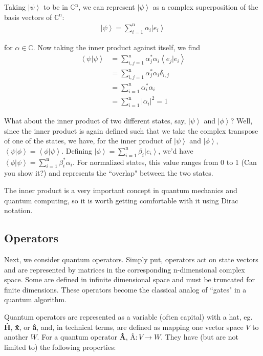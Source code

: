 \documentclass[11pt]{article} %
\newcommand{\ket}[1]{\left|#1\right\rangle}
\newcommand{\braket}[2]{\left\langle#1 |  #2\right\rangle}
\begin{document}
Taking $\ket{\psi}$ to be in $\mathbb{C}^\textrm{n}$, we can represent $\ket{\psi}$ as a complex superposition of the basis vectors of $\mathbb{C}^\textrm{n}$:
\begin{align}
    \ket{\psi} = \sum^\textrm{n}_{i=1}\alpha_i\ket{e_i} \nonumber
\end{align}

\noindent for $\alpha \in \mathbb{C}$. Now taking the inner product against itself, we find
\begin{align}
    \braket{\psi}{\psi} &= \sum^\textrm{n}_{i,j=1}\alpha_j^\ast\alpha_i\braket{e_j}{e_i}\nonumber\\
    &= \sum^\textrm{n}_{i,j=1}\alpha_j^\ast\alpha_i\delta_{i,j}\nonumber\\
    &= \sum^\textrm{n}_{i=1}\alpha_i^\ast\alpha_i\nonumber\\
    &= \sum^\textrm{n}_{i=1}\left|\alpha_i\right|^2 = 1\nonumber
\end{align}

What about the inner product of two different states, say, $\ket{\psi}$ and $\ket{\phi}$? Well, since the inner product is again defined such that we take the complex transpose of one of the states, we have, for the inner product of $\ket{\psi}$ and $\ket{\phi}$, $\braket{\psi}{\phi} = \braket{\phi}{\psi}$. Defining $\ket{\phi} = \sum^\textrm{n}_{i=1}\beta_i\ket{e_i}$, we'd have $\braket{\phi}{\psi} = \sum^\textrm{n}_{i=1}\beta_i^\ast\alpha_i$. For normalized states, this value ranges from 0 to 1 (Can you show it?) and represents the ``overlap" between the two states.

The inner product is a very important concept in quantum mechanics and quantum computing, so it is worth getting comfortable with it using Dirac notation.


\subsection{Operators} \label{operators}
Next, we consider quantum operators. Simply put, operators act on state vectors and are represented by matrices in the corresponding n-dimensional complex space. Some are defined in infinite dimensional space and must be truncated for finite dimensions. These operators become the classical analog of ``gates" in a quantum algorithm.

Quantum operators are represented as a variable (often capital) with a hat, eg. \textbf{\^{H}}, \textbf{\^{x}}, or \textbf{\^{a}}, and, in technical terms, are defined as mapping one vector space $V$ to another $W$. For a quantum operator \textbf{\^{A}}, $\textbf{\^{A}}: V \rightarrow W$. They have (but are not limited to) the following properties:
\end{document}
